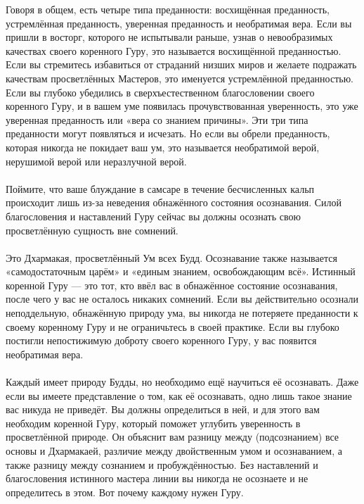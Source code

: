 Говоря в общем, есть четыре типа преданности: восхищённая преданность, устремлённая преданность, уверенная преданность и необратимая вера. Если вы пришли в восторг, которого не испытывали раньше, узнав о невообразимых качествах своего коренного Гуру, это называется восхищённой преданностью. Если вы стремитесь избавиться от страданий низших миров и желаете подражать качествам просветлённых Масте\-ров, это именуется устремлённой преданностью. Если вы глубоко убедились в сверхъестественном благословении свое\-го коренного Гуру, и в вашем уме появилась прочувствованная уверен\-ность, это уже уверенная преданность или «вера со знанием причины». Эти три типа преданности могут появляться и исчезать. Но если вы обрели преданность, которая никогда не покидает ваш ум, это называется необратимой верой, нерушимой верой или неразлучной верой.
\\ \\ Поймите, что ваше блуждание в самсаре в течение бесчисленных кальп происходит лишь из-за неведения обнажённого состояния осознавания. Силой благословения и наставлений Гуру сейчас вы должны осознать свою просветлённую сущность вне сомнений.
\\ \\ Это Дхармакая, просветлённый Ум всех Будд. Осознавание также называется «самодостаточным царём» и «единым знани\-ем, освобождающим всё». Истинный коренной Гуру — это тот, кто ввёл вас в обнажённое состояние осознавания, после чего у вас не осталось никаких сомнений. Если вы действительно осознали неподдельную, обнажённую природу ума, вы никогда не потеряете преданности к своему коренному Гуру и не ограничьтесь в своей практике. Если вы глубоко постигли непостижимую доброту своего коренного Гуру, у вас появится необратимая вера.
\\ \\ Каждый имеет природу Будды, но необходимо ещё научиться её осознавать. Даже если вы имеете представление о том, как её осознавать, одно лишь такое знание вас никуда не приведёт. Вы должны определиться в ней, и для этого вам необходим коренной Гуру, который поможет углубить уверенность в просветлённой природе. Он объяснит вам разницу между (подсознанием) все основы и Дхармакаей, различие между двойственным умом и осознаванием, а также разницу между сознанием и пробуждённостью. Без наставлений и благословения истинного мастера линии вы никогда не осознаете и не определитесь в этом. Вот почему каждому нужен Гуру.
